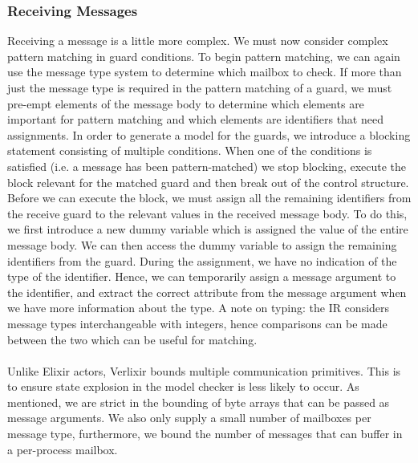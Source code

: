 \subsubsection{Receiving Messages}
Receiving a message is a little more complex. We must now consider complex pattern matching in guard conditions. To begin pattern matching, we can again use the message type system to determine which mailbox to check. If more than just the message type is required in the pattern matching of a guard, we must pre-empt elements of the message body to determine which elements are important for pattern matching and which elements are identifiers that need assignments. In order to generate a model for the guards, we introduce a blocking statement consisting of multiple conditions. When one of the conditions is satisfied (i.e. a message has been pattern-matched) we stop blocking, execute the block relevant for the matched guard and then break out of the control structure. Before we can execute the block, we must assign all the remaining identifiers from the receive guard to the relevant values in the received message body. To do this, we first introduce a new dummy variable which is assigned the value of the entire message body. We can then access the dummy variable to assign the remaining identifiers from the guard. During the assignment, we have no indication of the type of the identifier. Hence, we can temporarily assign a message argument to the identifier, and extract the correct attribute from the message argument when we have more information about the type. A note on typing: the IR considers message types interchangeable with integers, hence comparisons can be made between the two which can be useful for matching.
\\ \\
Unlike Elixir actors, Verlixir bounds multiple communication primitives. This is to ensure state explosion in the model checker is less likely to occur. As mentioned, we are strict in the bounding of byte arrays that can be passed as message arguments. We also only supply a small number of mailboxes per message type, furthermore, we bound the number of messages that can buffer in a per-process mailbox.
